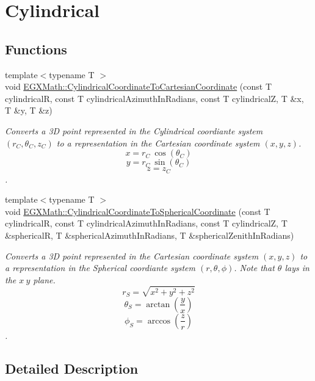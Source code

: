 \hypertarget{group___e_g_x_math-_conversions-_coordinate_conversions-3_d-_cylindrical}{}\section{Cylindrical}
\label{group___e_g_x_math-_conversions-_coordinate_conversions-3_d-_cylindrical}
\subsection*{Functions}
\begin{DoxyCompactItemize}
\item 
{\footnotesize template$<$typename T $>$ }\\void \mbox{\hyperlink{group___e_g_x_math-_conversions-_coordinate_conversions-3_d-_cylindrical_gafe64821df1452d3ec28206591b123b1a}{E\+G\+X\+Math\+::\+Cylindrical\+Coordinate\+To\+Cartesian\+Coordinate}} (const T cylindricalR, const T cylindrical\+Azimuth\+In\+Radians, const T cylindricalZ, T \&x, T \&y, T \&z)
\begin{DoxyCompactList}\small\item\em Converts a 3D point represented in the Cylindrical coordiante system $(r_C,\theta_C,z_C)$ to a representation in the Cartesian coordinate system $(x,y,z)$. \[ x = r_C\ \cos(\theta_C) \] \[ y = r_C\ \sin(\theta_C) \] \[ z = z_C \]. \end{DoxyCompactList}\item 
{\footnotesize template$<$typename T $>$ }\\void \mbox{\hyperlink{group___e_g_x_math-_conversions-_coordinate_conversions-3_d-_cylindrical_ga57a7d61d4baa007867817eb474394226}{E\+G\+X\+Math\+::\+Cylindrical\+Coordinate\+To\+Spherical\+Coordinate}} (const T cylindricalR, const T cylindrical\+Azimuth\+In\+Radians, const T cylindricalZ, T \&sphericalR, T \&spherical\+Azimuth\+In\+Radians, T \&spherical\+Zenith\+In\+Radians)
\begin{DoxyCompactList}\small\item\em Converts a 3D point represented in the Cartesian coordinate system $(x,y,z)$ to a representation in the Spherical coordiante system $(r,\theta,\phi)$. Note that $\theta$ lays in the $x\ y$ plane. \[ r_S = \sqrt{x^2+y^2+z^2} \] \[ \theta_S = \arctan(\frac{y}{x}) \] \[ \phi_S = \arccos(\frac{z}{r}) \]. \end{DoxyCompactList}\end{DoxyCompactItemize}


\subsection{Detailed Description}


